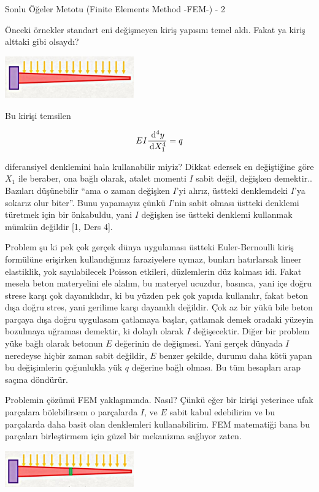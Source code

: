 \documentclass[12pt,fleqn]{article}\usepackage{../../common}
\begin{document}
Sonlu Öğeler Metotu (Finite Elements Method -FEM-) - 2

Önceki örnekler standart eni değişmeyen kiriş yapısını temel aldı.  Fakat ya
kiriş alttaki gibi olsaydı?

\includegraphics[width=15em]{compscieng_bpp45fem2_01.jpg}

Bu kirişi temsilen

$$
E I \frac{\,\mathrm{d}^4 y}{\,\mathrm{d} X_1^4} = q
$$

diferansiyel denklemini hala kullanabilir miyiz? Dikkat edersek en değiştiğine
göre $X_1$ ile beraber, ona bağlı olarak, atalet momenti $I$ sabit değil,
değişken demektir.. Bazıları düşünebilir ``ama o zaman değişken $I$'yi alırız,
üstteki denklemdeki $I$'ya sokarız olur biter''. Bunu yapamayız çünkü $I$'nin
sabit olması üstteki denklemi türetmek için bir önkabuldu, yani $I$ değişken ise
üstteki denklemi kullanmak mümkün değildir [1, Ders 4].

Problem şu ki pek çok gerçek dünya uygulaması üstteki Euler-Bernoulli kiriş
formülüne erişirken kullandığımız faraziyelere uymaz, bunları hatırlarsak lineer
elastiklik, yok sayılabilecek Poisson etkileri, düzlemlerin düz kalması idi.
Fakat mesela beton materyelini ele alalım, bu materyel ucuzdur, basınca, yani
içe doğru strese karşı çok dayanıklıdır, ki bu yüzden pek çok yapıda kullanılır,
fakat beton dışa doğru stres, yani gerilime karşı dayanıklı değildir. Çok az bir
yükü bile beton parçaya dışa doğru uygulasam çatlamaya başlar, çatlamak demek
oradaki yüzeyin bozulmaya uğraması demektir, ki dolaylı olarak $I$
değişecektir. Diğer bir problem yüke bağlı olarak betonun $E$ değerinin de
değişmesi. Yani gerçek dünyada $I$ neredeyse hiçbir zaman sabit değildir, $E$
benzer şekilde, durumu daha kötü yapan bu değişimlerin çoğunlukla yük $q$
değerine bağlı olması. Bu tüm hesapları arap saçına döndürür.

Problemin çözümü FEM yaklaşımında. Nasıl? Çünkü eğer bir kirişi yeterince ufak
parçalara bölebilirsem o parçalarda $I$, ve $E$ sabit kabul edebilirim ve bu
parçalarda daha basit olan denklemleri kullanabilirim. FEM matematiği bana bu
parçaları birleştirmem için güzel bir mekanizma sağlıyor zaten.

\includegraphics[width=15em]{compscieng_bpp45fem2_02.jpg}
\end{document}
